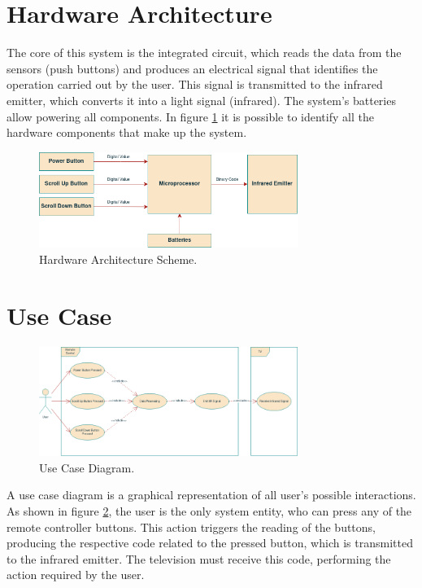 \documentclass[12pt, letterpaper]{report}
\begin{document}
\section{Hardware Architecture}
The core of this system is the integrated circuit, which reads the data from the sensors (push buttons) and produces an electrical signal that identifies the operation carried out by the user. This signal is transmitted to the infrared emitter, which converts it into a light signal (infrared). The system's batteries allow powering all components. In figure \ref{fig:hw_arch} it is possible to identify all the hardware components that make up the system. 

\begin{figure}[ht]
	\centering
	\includegraphics[width=0.75\textwidth]{HW_Arch}
	\caption{Hardware Architecture Scheme.}
	\label{fig:hw_arch}
\end{figure}


\section{Use Case}

\begin{figure}[ht]
	\centering
	\includegraphics[width=0.75\textwidth]{Use-Case}
	\caption{Use Case Diagram.}
	\label{fig:use_case}
\end{figure}

A use case diagram is a graphical representation of all user’s possible interactions. As shown in figure \ref{fig:use_case}, the user is the only system entity, who can press any of the remote controller buttons. This action triggers the reading of the buttons, producing the respective code related to the pressed button, which is transmitted to the infrared emitter. The television must receive this code, performing the action required by the user.
\end{document}

